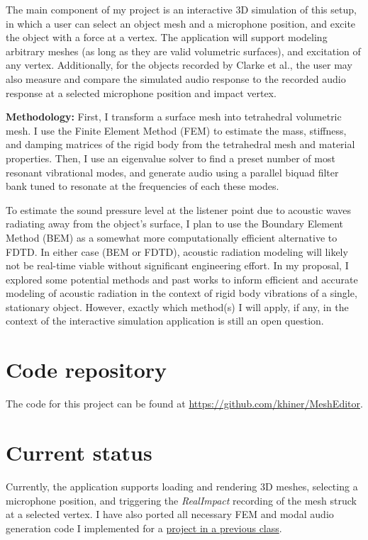 \documentclass[12pt]{article}
\begin{document}
The main component of my project is an interactive 3D simulation of this setup, in which a user can select an object mesh and a microphone position, and excite the object with a force at a vertex.
The application will support modeling arbitrary meshes (as long as they are valid volumetric surfaces), and excitation of any vertex.
Additionally, for the objects recorded by Clarke et al., the user may also measure and compare the simulated audio response to the recorded audio response at a selected microphone position and impact vertex.

\textbf{Methodology:} First, I transform a surface mesh into tetrahedral volumetric mesh.
I use the Finite Element Method (FEM) to estimate the mass, stiffness, and damping matrices of the rigid body from the tetrahedral mesh and material properties.
Then, I use an eigenvalue solver to find a preset number of most resonant vibrational modes, and generate audio using a parallel biquad filter bank tuned to resonate at the frequencies of each these modes.

To estimate the sound pressure level at the listener point due to acoustic waves radiating away from the object's surface, I plan to use the Boundary Element Method (BEM) as a somewhat more computationally efficient alternative to FDTD.
In either case (BEM or FDTD), acoustic radiation modeling will likely not be real-time viable without significant engineering effort.
In my proposal, I explored some potential methods and past works to inform efficient and accurate modeling of acoustic radiation in the context of rigid body vibrations of a single, stationary object.
However, exactly which method(s) I will apply, if any, in the context of the interactive simulation application is still an open question.

\section{Code repository}

The code for this project can be found at \href{https://github.com/khiner/MeshEditor}{https://github.com/khiner/MeshEditor}.

\section{Current status}

Currently, the application supports loading and rendering 3D meshes, selecting a microphone position, and triggering the \textit{RealImpact} recording of the mesh struck at a selected vertex.
I have also ported all necessary FEM and modal audio generation code I implemented for a \href{https://github.com/GATech-CSE-6730-Spring-2023-Project/mesh2audio}{project in a previous class}.
\end{document}
